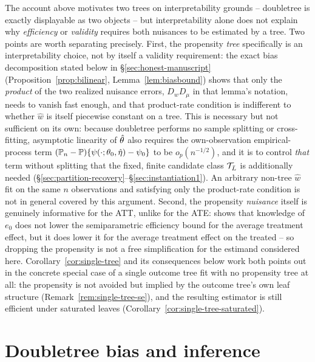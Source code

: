 \documentclass[12pt]{article}
\begin{document}
\begin{remark}
\label{rem:two-trees-why}
The account above motivates two trees on interpretability grounds -- doubletree is exactly displayable as two objects -- but interpretability alone does not explain why \emph{efficiency} or \emph{validity} requires both nuisances to be estimated by a tree. Two points are worth separating precisely. First, the propensity \emph{tree} specifically is an interpretability choice, not by itself a validity requirement: the exact bias decomposition stated below in \S\ref{sec:honest-manuscript} (Proposition~\ref{prop:bilinear}, Lemma~\ref{lem:biasbound}) shows that only the \emph{product} of the two realized nuisance errors, $D_wD_\mu$ in that lemma's notation, needs to vanish fast enough, and that product-rate condition is indifferent to whether $\hat w$ is itself piecewise constant on a tree. This is necessary but not sufficient on its own: because doubletree performs no sample splitting or cross-fitting, asymptotic linearity of $\hat{\theta}$ also requires the own-observation empirical-process term $(\mathbb{P}_n-\mathbb{P})\{\psi(\cdot;\theta_0,\hat\eta)-\psi_0\}$ to be $o_p(n^{-1/2})$, and it is to control \emph{that} term without splitting that the fixed, finite candidate class $\mathcal{T}_{\bar{L}}$ is additionally needed (\S\ref{sec:partition-recovery}--\S\ref{sec:instantiation1}). An arbitrary non-tree $\hat w$ fit on the same $n$ observations and satisfying only the product-rate condition is not in general covered by this argument. Second, the propensity \emph{nuisance} itself is genuinely informative for the ATT, unlike for the ATE: \citet{hahn1998} shows that knowledge of $e_0$ does not lower the semiparametric efficiency bound for the average treatment effect, but it does lower it for the average treatment effect on the treated -- so dropping the propensity is not a free simplification for the estimand considered here. Corollary~\ref{cor:single-tree} and its consequences below work both points out in the concrete special case of a single outcome tree fit with no propensity tree at all: the propensity is not avoided but implied by the outcome tree's own leaf structure (Remark~\ref{rem:single-tree-se}), and the resulting estimator is still efficient under saturated leaves (Corollary~\ref{cor:single-tree-saturated}).
\end{remark}

\section{Doubletree bias and inference}
\end{document}
